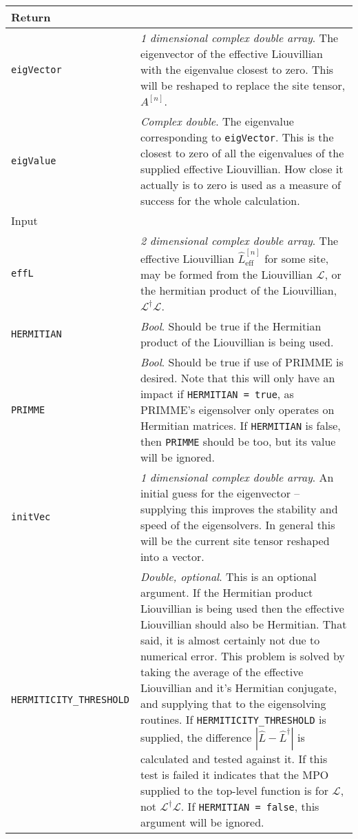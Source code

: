  \begin{longtabu}{X[1,1]X[4,1]}
 \hline
 Return & \\ \hline
 \lstinline$eigVector$ & \emph{1 dimensional complex double array}. The eigenvector of the effective Liouvillian with the eigenvalue closest to zero. This will be reshaped to replace the site tensor, \(A^{[n]}\). \\
 \lstinline$eigValue$ & \emph{Complex double}. The eigenvalue corresponding to \lstinline$eigVector$. This is the closest to zero of all the eigenvalues of the supplied effective Liouvillian. How close it actually is to zero is used as a measure of success for the whole calculation. \\ \hline
 Input & \\ \hline
 \lstinline$effL$ & \emph{2 dimensional complex double array}. The effective Liouvillian \(\hat{L}^{[n]}_{\mathrm{eff}}\) for some site, may be formed from the Liouvillian \(\mathcal{L}\), or the hermitian product of the Liouvillian, \(\mathcal{L}^{\dagger}\mathcal{L}\). \\ 
 \lstinline$HERMITIAN$ & \emph{Bool}. Should be true if the Hermitian product of the Liouvillian is being used. \\
 \lstinline$PRIMME$ & \emph{Bool}. Should be true if use of PRIMME is desired. Note that this will only have an impact if \lstinline$HERMITIAN = true$, as PRIMME's eigensolver only operates on Hermitian matrices. If \lstinline$HERMITIAN$ is false, then \lstinline$PRIMME$ should be too, but its value will be ignored. \\
 \lstinline$initVec$ & \emph{1 dimensional complex double array}. An initial guess for the eigenvector -- supplying this improves the stability and speed of the eigensolvers. In general this will be the current site tensor reshaped into a vector. \\
 \lstinline$HERMITICITY_THRESHOLD$ & \emph{Double, optional}. This is an optional argument. If the Hermitian product Liouvillian is being used then the effective Liouvillian should also be Hermitian. That said, it is almost certainly not due to numerical error. This problem is solved by taking the average of the effective Liouvillian and it's Hermitian conjugate, and supplying that to the eigensolving routines. If \lstinline$HERMITICITY_THRESHOLD$ is supplied, the difference \(|\hat{L} - \hat{L}^{\dagger}|\) is calculated and tested against it. If this test is failed it indicates that the MPO supplied to the top-level function is for \(\mathcal{L}\), not \(\mathcal{L}^{\dagger}\mathcal{L}\). If \lstinline$HERMITIAN = false$, this argument will be ignored.  \\
 \hline
 \end{longtabu}
